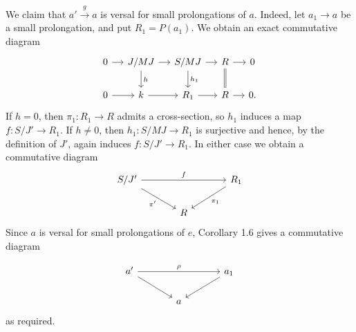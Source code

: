 We claim that $a'\xrightarrow g a$ is versal for small prolongations
of $a$. Indeed, let $a_1\longrightarrow a$ be a small prolongation,
and put $R_1=P(a_1)$. We obtain an exact commutative diagram
\[
\begin{tikzcd}[column sep=small]
0 \arrow[r] & J/MJ \arrow[r] \arrow[d,"h"]
 & S/MJ \arrow[r] \arrow[d,"h_1"]
 & R \arrow[r] \arrow[d,equal] & 0 \\
0 \arrow[r] & k \arrow[r] & R_1 \arrow[r] & R \arrow[r] & 0.
\end{tikzcd}
\]
If $h=0$, then $\pi_1:R_1\longrightarrow R$ admits a cross-section,
so $h_1$ induces a map $f:S/J'\longrightarrow R_1$. If $h\ne0$,
then $h_1:S/MJ\longrightarrow R_1$ is surjective and hence, by the
definition of $J'$, again induces $f:S/J'\longrightarrow R_1$.
In either case we obtain a commutative diagram
\[
\begin{tikzcd}[column sep=large]
S/J' \arrow[rr,"f"] \arrow[dr,"\pi'"']
 & & R_1 \arrow[dl,"\pi_1"] \\
& R &
\end{tikzcd}
\]
Since $a$ is versal for small prolongations of $e$, Corollary 1.6
gives a commutative diagram


\[
\begin{tikzcd}[column sep=large]
a' \arrow[rr,"\rho"] \arrow[dr] & & a_1 \arrow[dl] \\
& a &
\end{tikzcd}
\]
as required.

